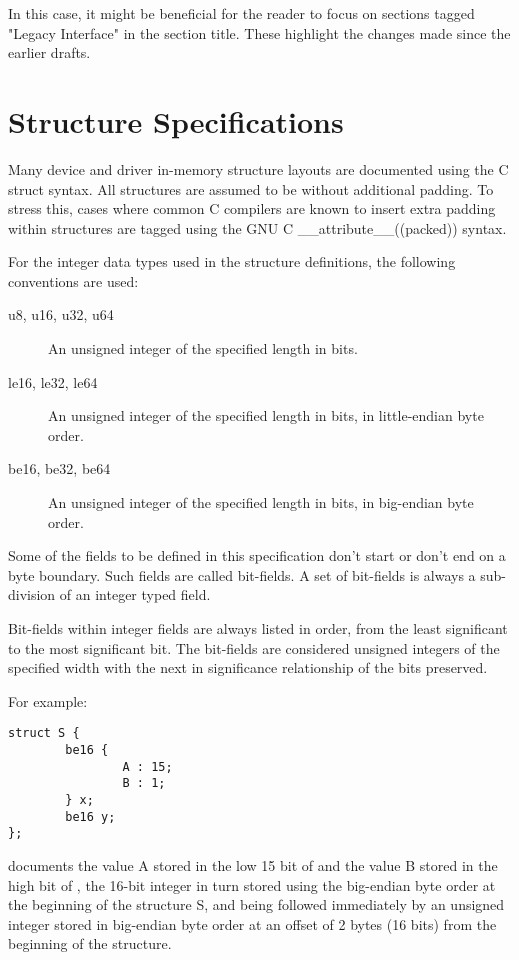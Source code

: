 In this case, it might be beneficial for the reader to focus on
sections tagged "Legacy Interface" in the section title.
These highlight the changes made since the earlier drafts.

\section{Structure Specifications}\label{sec:Structure Specifications}

Many device and driver in-memory structure layouts are documented using
the C struct syntax. All structures are assumed to be without additional
padding. To stress this, cases where common C compilers are known to insert
extra padding within structures are tagged using the GNU C
__attribute__((packed))  syntax.

For the integer data types used in the structure definitions, the following
conventions are used:

\begin{description}
\item[u8, u16, u32, u64] An unsigned integer of the specified length in bits.

\item[le16, le32, le64] An unsigned integer of the specified length in bits,
in little-endian byte order.

\item[be16, be32, be64] An unsigned integer of the specified length in bits,
in big-endian byte order.
\end{description}

Some of the fields to be defined in this specification don't
start or don't end on a byte boundary. Such fields are called bit-fields.
A set of bit-fields is always a sub-division of an integer typed field.

Bit-fields within integer fields are always listed in order,
from the least significant to the most significant bit.  The
bit-fields are considered unsigned integers of the specified
width with the next in significance relationship of the bits
preserved.

For example:
\begin{lstlisting}
struct S {
        be16 {
                A : 15;
                B : 1;
        } x;
        be16 y;
};
\end{lstlisting}
documents the value A stored in the low 15 bit of  and
the value B stored in the high bit of , the 16-bit
integer  in turn stored using the big-endian byte order
at the beginning of the structure S,
and being followed immediately by an unsigned integer 
stored in big-endian byte order at an offset of 2 bytes (16 bits)
from the beginning of the structure.

